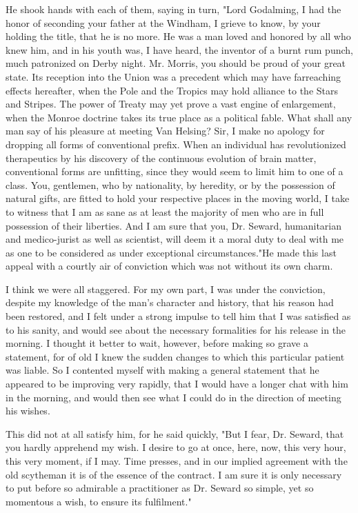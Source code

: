He shook hands with each of them, saying in turn, "Lord Godalming, I had the honor of seconding your father at the Windham, I grieve to know, by your holding the title, that he is no more. He was a man loved and honored by all who knew him, and in his youth was, I have heard, the inventor of a burnt rum punch, much patronized on Derby night. Mr. Morris, you should be proud of your great state. Its reception into the Union was a precedent which may have farreaching effects hereafter, when the Pole and the Tropics may hold alliance to the Stars and Stripes. The power of Treaty may yet prove a vast engine of enlargement, when the Monroe doctrine takes its true place as a political fable. What shall any man say of his pleasure at meeting Van Helsing? Sir, I make no apology for dropping all forms of conventional prefix. When an individual has revolutionized therapeutics by his discovery of the continuous evolution of brain matter, conventional forms are unfitting, since they would seem to limit him to one of a class. You, gentlemen, who by nationality, by heredity, or by the possession of natural gifts, are fitted to hold your respective places in the moving world, I take to witness that I am as sane as at least the majority of men who are in full possession of their liberties. And I am sure that you, Dr. Seward, humanitarian and medico-jurist as well as scientist, will deem it a moral duty to deal with me as one to be considered as under exceptional circumstances."He made this last appeal with a courtly air of conviction which was not without its own charm. 

I think we were all staggered. For my own part, I was under the conviction, despite my knowledge of the man's character and history, that his reason had been restored, and I felt under a strong impulse to tell him that I was satisfied as to his sanity, and would see about the necessary formalities for his release in the morning. I thought it better to wait, however, before making so grave a statement, for of old I knew the sudden changes to which this particular patient was liable. So I contented myself with making a general statement that he appeared to be improving very rapidly, that I would have a longer chat with him in the morning, and would then see what I could do in the direction of meeting his wishes. 

This did not at all satisfy him, for he said quickly, "But I fear, Dr. Seward, that you hardly apprehend my wish. I desire to go at once, here, now, this very hour, this very moment, if I may. Time presses, and in our implied agreement with the old scytheman it is of the essence of the contract. I am sure it is only necessary to put before so admirable a practitioner as Dr. Seward so simple, yet so momentous a wish, to ensure its fulfilment." 

